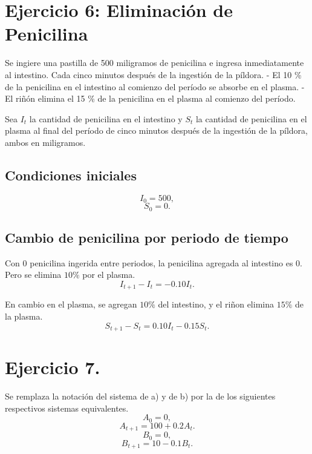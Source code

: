 \documentclass[11pt]{article}
\begin{document}
    \hypertarget{ejercicio-6-eliminaciuxf3n-de-penicilina}{%
\section*{Ejercicio 6: Eliminación de
Penicilina}\label{ejercicio-6-eliminaciuxf3n-de-penicilina}}

Se ingiere una pastilla de 500 miligramos de penicilina e ingresa
inmediatamente al intestino. Cada cinco minutos después de la ingestión
de la píldora. - El 10 \% de la penicilina en el intestino al comienzo
del período se absorbe en el plasma. - El riñón elimina el 15 \% de la
penicilina en el plasma al comienzo del período.

Sea \(I_t\) la cantidad de penicilina en el intestino y \(S_t\) la
cantidad de penicilina en el plasma al final del período de cinco
minutos después de la ingestión de la píldora, ambos en miligramos.

    \hypertarget{condiciones-iniciales}{%
\subsection*{Condiciones iniciales}\label{condiciones-iniciales}}

\[I_0 = 500,\] \[S_0 = 0.\]

    \hypertarget{cambio-de-penicilina-por-periodo-de-tiempo}{%
\subsection*{Cambio de penicilina por periodo de
tiempo}\label{cambio-de-penicilina-por-periodo-de-tiempo}}

Con \(0\) penicilina ingerida entre periodos, la penicilina agregada al
intestino es \(0\). Pero se elimina \(10\%\) por el plasma.
\[I_{t+1}-I_t = -0.10 I_t.\]

En cambio en el plasma, se agregan \(10\%\) del intestino, y el riñon
elimina \(15\%\) de la plasma. \[S_{t+1}-S_t = 0.10 I_t -0.15 S_t.\]

    \hypertarget{ejercicio-7.}{%
\section*{Ejercicio 7.}\label{ejercicio-7.}}

Se remplaza la notación del sistema de a) y de b) por la de los
siguientes respectivos sistemas equivalentes. \[A_0 = 0,\]
\[A_{t+1} = 100+0.2 A_t.\] \[B_0 = 0,\] \[B_{t+1} = 10 -0.1 B_t.\]
\end{document}
